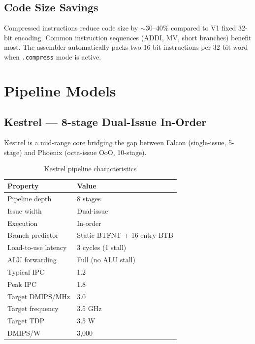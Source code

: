 \documentclass[11pt,a4paper]{article}
\begin{document}
\subsection{Code Size Savings}
Compressed instructions reduce code size by $\sim$30--40\% compared to V1
fixed 32-bit encoding. Common instruction sequences (ADDI, MV, short
branches) benefit most. The assembler automatically packs two 16-bit
instructions per 32-bit word when {\tt .compress} mode is active.

\newpage

\section{Pipeline Models}

\subsection{Kestrel --- 8-stage Dual-Issue In-Order}

Kestrel is a mid-range core bridging the gap between Falcon (single-issue,
5-stage) and Phoenix (octa-issue OoO, 10-stage).

\begin{table}[H]
\centering
\caption{Kestrel pipeline characteristics}
\begin{tabular}{ll}
\toprule
Property & Value \\
\midrule
Pipeline depth & 8 stages \\
Issue width & Dual-issue \\
Execution & In-order \\
Branch predictor & Static BTFNT + 16-entry BTB \\
Load-to-use latency & 3 cycles (1 stall) \\
ALU forwarding & Full (no ALU stall) \\
Typical IPC & 1.2 \\
Peak IPC & 1.8 \\
Target DMIPS/MHz & 3.0 \\
Target frequency & 3.5 GHz \\
Target TDP & 3.5 W \\
DMIPS/W & 3,000 \\
\bottomrule
\end{tabular}
\end{table}
\end{document}
